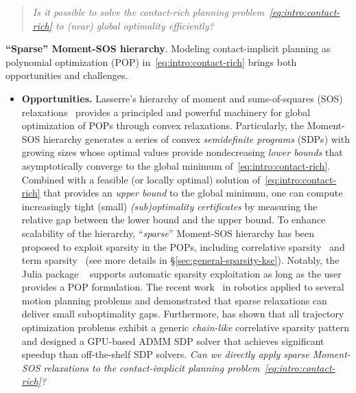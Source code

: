 
\begin{quote}
    \textit{Is it possible to solve the contact-rich planning problem~\eqref{eq:intro:contact-rich} to (near) global optimality efficiently?}
\end{quote}


\textbf{``Sparse'' Moment-SOS hierarchy}. 
Modeling contact-implicit planning as polynomial optimization (POP) in~\eqref{eq:intro:contact-rich} brings both opportunities and challenges. 
\begin{itemize}
    \item \textbf{Opportunities.} Lasserre's hierarchy of moment and sums-of-squares (SOS) relaxations~\cite{lasserre2001siopt-global} provides a principled and powerful machinery for global optimization of POPs through convex relaxations. Particularly, the Moment-SOS hierarchy generates a series of convex \textit{semidefinite programs} (SDPs) with growing sizes whose optimal values provide nondecreasing \emph{lower bounds} that asymptotically converge to the global minimum of~\eqref{eq:intro:contact-rich}. Combined with a feasible (or locally optimal) solution of~\eqref{eq:intro:contact-rich} that provides an \emph{upper bound} to the global minimum, one can compute increasingly tight (small) \emph{(sub)optimality certificates} by measuring the relative gap between the lower bound and the upper bound. To enhance scalability of the hierarchy, ``\emph{sparse}'' Moment-SOS hierarchy has been proposed to exploit sparsity in the POPs, including correlative sparsity~\cite{lasserre2006msc-correlativesparse,huang2024arxiv-sparsehomogenization} and term sparsity~\cite{wang2021siam-tssos, magron23book-sparse} (see more details in \S\ref{sec:general-sparsity-ksc}). Notably, the Julia package \tssos~\cite{magron2021arxiv-julia-tssos} supports automatic sparsity exploitation as long as the user provides a POP formulation. The recent work~\cite{ teng2024ijrr-convex-geometric-motion-planning} in robotics applied \tssos to several motion planning problems and demonstrated that sparse relaxations can deliver small suboptimality gaps. Furthermore, \cite{kang2024wafr-strom} has shown that all trajectory optimization problems exhibit a generic \emph{chain-like} correlative sparsity pattern and designed a GPU-based ADMM SDP solver that achieves significant speedup than off-the-shelf SDP solvers. \emph{Can we directly apply sparse Moment-SOS relaxations to the contact-implicit planning problem~\eqref{eq:intro:contact-rich}?}
    

\end{itemize}
